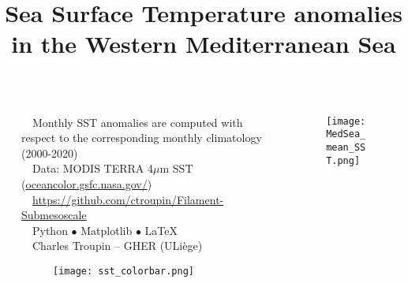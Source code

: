 \documentclass[11pt,a4paper,svgnames,final]{beamer}
\title{Sea Surface Temperature anomalies\\ in the Western Mediterranean Sea}
\begin{document}
\begin{columns}[T]
\begin{column}{2cm}

\end{column}

\begin{column}{.5\textwidth}

\begin{block}
\large
\faInfoCircle~~Monthly SST anomalies are computed with respect to the corresponding monthly climatology (2000-2020)\\ 
\faLink~~Data: MODIS TERRA 4$\mu$m SST (\url{oceancolor.gsfc.nasa.gov/})\\
\faGithub~~\url{https://github.com/ctroupin/Filament-Submesoscale}\\
\faWrench~~Python $\bullet$ Matplotlib $\bullet$ \LaTeX\\
\faCreativeCommons~~Charles Troupin -- GHER (ULiège)
\end{block}

\begin{figure}
\centering
\texttt{[image: sst\_colorbar.png]}
\end{figure}

\end{column}

\begin{column}{.5\textwidth}

\begin{figure}
\centering
\texttt{[image: MedSea\_mean\_SST.png]}
\end{figure}
\end{column}
\end{columns}
\end{document}
